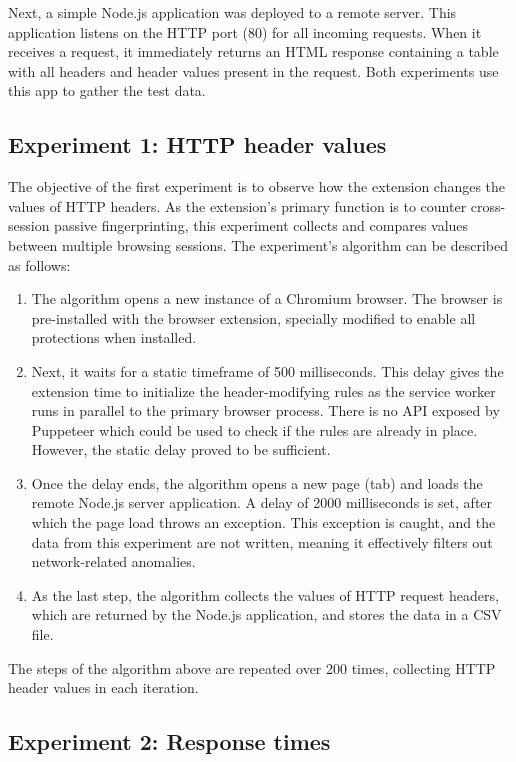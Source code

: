 Next, a simple Node.js application was deployed to a remote server. This application listens on the HTTP port (80) for all incoming requests. When it receives a request, it immediately returns an HTML response containing a table with all headers and header values present in the request. Both experiments use this app to gather the test data.

\subsection{Experiment 1: HTTP header values}

The objective of the first experiment is to observe how the extension changes the values of HTTP headers. As the extension's primary function is to counter cross-session passive fingerprinting, this experiment collects and compares values between multiple browsing sessions. The experiment's algorithm can be described as follows:

\begin{enumerate}
	\item The algorithm opens a new instance of a Chromium browser. The browser is pre-installed with the browser extension, specially modified to enable all protections when installed.
	\item Next, it waits for a static timeframe of 500 milliseconds. This delay gives the extension time to initialize the header-modifying rules as the service worker runs in parallel to the primary browser process. There is no API exposed by Puppeteer which could be used to check if the rules are already in place. However, the static delay proved to be sufficient.
	\item Once the delay ends, the algorithm opens a new page (tab) and loads the remote Node.js server application. A delay of 2000 milliseconds is set, after which the page load throws an exception. This exception is caught, and the data from this experiment are not written, meaning it effectively filters out network-related anomalies.
	\item As the last step, the algorithm collects the values of HTTP request headers, which are returned by the Node.js application, and stores the data in a CSV file.
\end{enumerate}

The steps of the algorithm above are repeated over 200 times, collecting HTTP header values in each iteration.

\subsection{Experiment 2: Response times}

